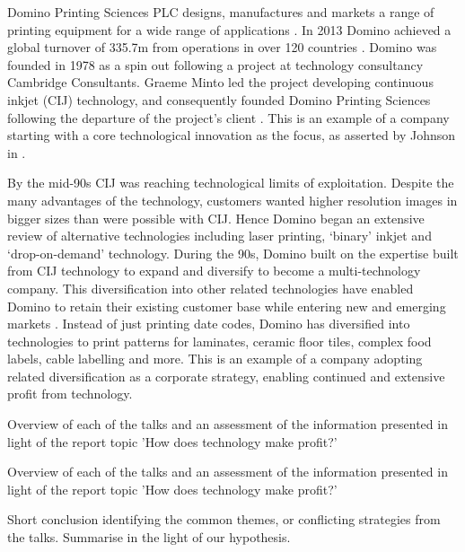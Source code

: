  \label{Sect1}

Domino Printing Sciences PLC designs, manufactures and markets a range of printing equipment for a wide range of applications \cite{DominoAnnual}. 
In 2013 Domino achieved a global turnover of \textsterling335.7m from operations in over 120 countries \cite{DominoFactsheet}. 
Domino was founded in 1978 \cite{DominoFactsheet} as a spin out following a project at technology consultancy Cambridge Consultants.
Graeme Minto led the project developing continuous inkjet (CIJ) technology, and consequently founded Domino Printing Sciences following the departure of the project's client \cite{goffin2010innovation}.
This is an example of a company starting with a core technological innovation as the focus, as asserted by Johnson in \cite{ johnson2008exploring}.

By the mid-90s CIJ was reaching technological limits of exploitation. 
Despite the many advantages of the technology, customers wanted higher resolution images in bigger sizes than were possible with CIJ. Hence Domino began an extensive review of alternative technologies including laser printing, `binary' inkjet and `drop-on-demand' technology.
During the 90s, Domino built on the expertise built from CIJ technology to expand and diversify to become a multi-technology company. 
This diversification into other related technologies have enabled Domino to retain their existing customer base while entering new and emerging markets \cite{goffin2010innovation}.
Instead of just printing date codes, Domino has diversified into technologies to print patterns for laminates, ceramic floor tiles, complex food labels, cable labelling and more.
This is an example of a company adopting related diversification as a corporate strategy, enabling continued and extensive profit from technology.

Overview of each of the talks and an assessment of the information presented in light of the report topic 'How does technology make profit?' 

Overview of each of the talks and an assessment of the information presented in light of the report topic 'How does technology make profit?' 

Short conclusion identifying the common themes, or conflicting strategies from the talks.
Summarise in the light of our hypothesis.



